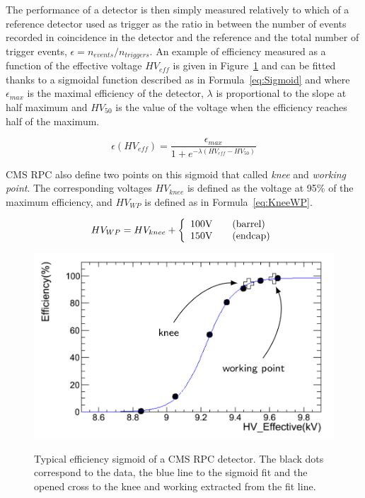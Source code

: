 	The performance of a detector is then simply measured relatively to which of a reference detector used as trigger as the ratio in between the number of events recorded in coincidence in the detector and the reference and the total number of trigger events, $\epsilon = n_{events}/n_{triggers}$. An example of efficiency measured as a function of the effective voltage $HV_{eff}$ is given in Figure~\ref{fig:Sigmoid} and can be fitted thanks to a sigmoidal function described as in Formula~\ref{eq:Sigmoid} and where $\epsilon_{max}$ is the maximal efficiency of the detector, $\lambda$ is proportional to the slope at half maximum and $HV_{50}$ is the value of the voltage when the efficiency reaches half of the maximum.
	
	\begin{equation}
	\label{eq:Sigmoid}
	\epsilon(HV_{eff}) = \frac{\epsilon_{max}}{1+e^{-\lambda(HV_{eff}-HV_{50})}}
	\end{equation}
	
	CMS RPC also define two points on this sigmoid that called \textit{knee} and \textit{working point}. The corresponding voltages $HV_{knee}$ is defined as the voltage at 95\% of the maximum efficiency, and $HV_{WP}$ is defined as in Formula~\ref{eq:KneeWP}.
	
	\begin{equation}
	\label{eq:KneeWP}
	HV_{WP} = HV_{knee} + \left\{\begin{array}{l l}100\mathrm{V} & \quad \mathrm{(barrel)}\\ 150\mathrm{V} & \quad \mathrm{(endcap)}\\ \end{array}\right.
	\end{equation}
	
	\begin{figure}[H]
		\centering
		\includegraphics[width = 0.7\plotwidth]{fig/chapt4/Eff_sigmoid.png}\\
		\caption{\label{fig:Sigmoid} Typical efficiency sigmoid of a CMS RPC detector. The black dots correspond to the data, the blue line to the sigmoid fit and the opened cross to the knee and working extracted from the fit line.}
	\end{figure}
	
